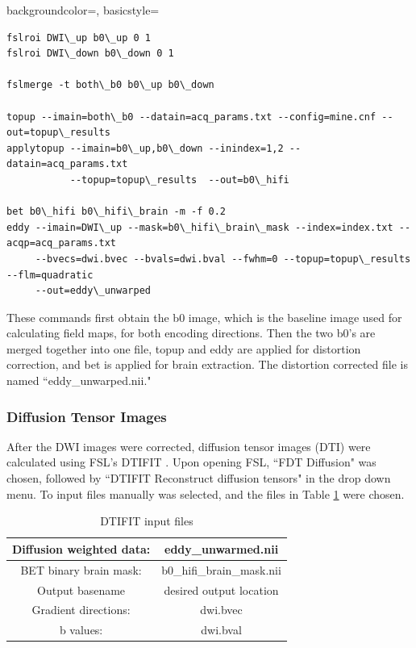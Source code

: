 {
    backgroundcolor=\color{white},
    basicstyle=\scriptsize\color{black}\ttfamily
}

\begin{lstlisting}[style=DOS]
fslroi DWI\_up b0\_up 0 1
fslroi DWI\_down b0\_down 0 1

fslmerge -t both\_b0 b0\_up b0\_down

topup --imain=both\_b0 --datain=acq_params.txt --config=mine.cnf --out=topup\_results
applytopup --imain=b0\_up,b0\_down --inindex=1,2 --datain=acq_params.txt
           --topup=topup\_results  --out=b0\_hifi

bet b0\_hifi b0\_hifi\_brain -m -f 0.2
eddy --imain=DWI\_up --mask=b0\_hifi\_brain\_mask --index=index.txt --acqp=acq_params.txt
     --bvecs=dwi.bvec --bvals=dwi.bval --fwhm=0 --topup=topup\_results --flm=quadratic
     --out=eddy\_unwarped

\end{lstlisting}

These commands first obtain the b0 image, which is the baseline image used for calculating field maps, for both encoding directions. Then the two b0's are merged together into one file, topup and eddy are applied for distortion correction, and bet is applied for brain extraction. The distortion corrected file is named ``eddy\_unwarped.nii."

\subsubsection{Diffusion Tensor Images}

After the DWI images were corrected, diffusion tensor images (DTI) were calculated using FSL's DTIFIT \cite{ref:dtifit}. Upon opening FSL, ``FDT Diffusion" was chosen, followed by ``DTIFIT Reconstruct diffusion tensors" in the drop down menu. To input files manually was selected, and the files in Table \ref{tab:dtifit} were chosen.

\begin{table}[H]
\centering
\caption{DTIFIT input files}
\label{tab:dtifit}
\begin{tabular}{|c|c|}
\hline
Diffusion weighted data: & eddy\_unwarmed.nii        \\ \hline
BET binary brain mask:   & b0\_hifi\_brain\_mask.nii \\ \hline
Output basename          & desired output location   \\ \hline
Gradient directions:     & dwi.bvec                  \\ \hline
b values:                & dwi.bval                  \\ \hline
\end{tabular}
\end{table}

